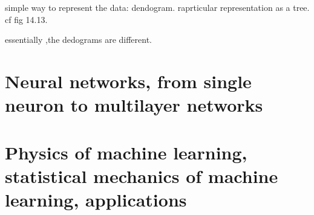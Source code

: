 \documentclass[a4paper]{tufte-book}
\begin{document}
simple way to represent the data: dendogram. raprticular representation as a tree. cf fig 14.13.

essentially ,the dedograms are different.

















\chapter{Neural networks, from single neuron to multilayer networks}
\label{ch:neural-networks}
\chapter{Physics of machine learning, statistical mechanics of machine learning, applications}
\label{ch:physics}
\end{document}
